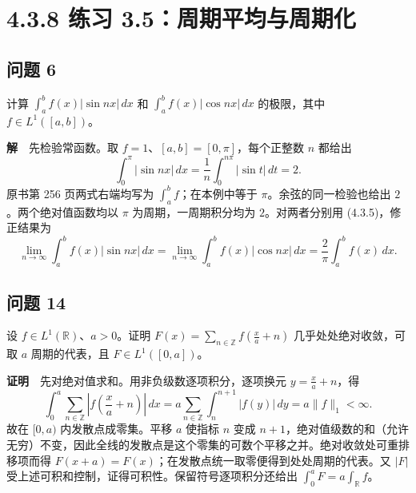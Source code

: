 \documentclass[11pt,a4paper]{article}
\begin{document}
\section[\S{}4.3.8 练习
3.5：周期平均与周期化]{4.3.8 练习
3.5：周期平均与周期化}\label{ux7ec3ux4e60-3.5ux5468ux671fux5e73ux5747ux4e0eux5468ux671fux5316}

\subsection{问题 6}\label{ux95eeux9898-6}

计算 \(\int_a^b f(x)|\sin nx|\,dx\) 和 \(\int_a^b f(x)|\cos nx|\,dx\)
的极限，其中 \(f\in L^1([a,b])\)。

\textbf{解}　先检验常函数。取 \(f=1\)、\([a,b]=[0,\pi]\)，每个正整数
\(n\) 都给出 \begin{equation*}
\int_0^\pi|\sin nx|\,dx=\frac{1}{n}\int_0^{n\pi}|\sin t|\,dt=2 .
\end{equation*} 原书第 256 页两式右端均写为 \(\int_a^bf\)；在本例中等于
\(\pi\)。余弦的同一检验也给出 \(2\)。两个绝对值函数均以 \(\pi\)
为周期，一周期积分均为 \(2\)。对两者分别用 (4.3.5)，修正结果为 \begin{equation*}
\lim_{n\to\infty}\int_a^b f(x)|\sin nx|\,dx
=\lim_{n\to\infty}\int_a^b f(x)|\cos nx|\,dx
=\frac{2}{\pi}\int_a^b f(x)\,dx .
\end{equation*}

\subsection{问题 14}\label{ux95eeux9898-14}

设 \(f\in L^1(\mathbb R)\)、\(a>0\)。证明
\(F(x)=\sum_{n\in\mathbb Z} f(\frac{x}{a}+n)\) 几乎处处绝对收敛，可取
\(a\) 周期的代表，且 \(F\in L^1([0,a])\)。

\textbf{证明}　先对绝对值求和。用非负级数逐项积分，逐项换元
\(y=\frac{x}{a}+n\)，得 \begin{equation*}
\int_0^a\sum_{n\in\mathbb Z}|f(\frac{x}{a}+n)|\,dx
=a\sum_{n\in\mathbb Z}\int_n^{n+1}|f(y)|\,dy
=a\|f\|_1<\infty .
\end{equation*} 故在 \([0,a)\) 内发散点成零集。平移 \(a\) 使指标 \(n\) 变成
\(n+1\)，绝对值级数的和（允许无穷）不变，因此全线的发散点是这个零集的可数个平移之并。绝对收敛处可重排移项而得
\(F(x+a)=F(x)\)；在发散点统一取零便得到处处周期的代表。又 \(|F|\)
受上述可积和控制，证得可积性。保留符号逐项积分还给出
\(\int_0^a F=a\int_{\mathbb R} f\)。
\end{document}
